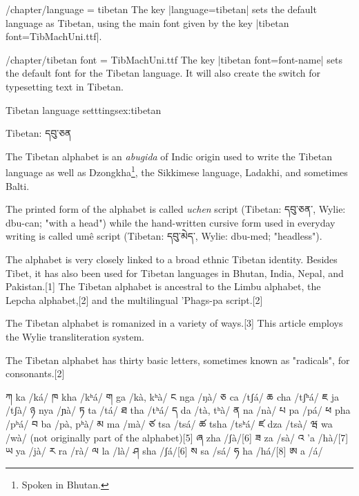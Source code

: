



\begin{key}{/chapter/language = tibetan} The key |language=tibetan| sets the default language as Tibetan, using the main font given by the key |tibetan font=TibMachUni.ttf|.
\end{key}

\begin{key}{/chapter/tibetan font = TibMachUni.ttf} The key |tibetan font=font-name| sets the default font for the Tibetan language. It will also create the switch \cmd{\tibetan} for typesetting text in Tibetan.
\end{key}

\begin{texexample}{Tibetan language setttings}{ex:tibetan}
\tibetan

\tibetan Tibetan: དབུ་ཅན
\end{texexample}


The Tibetan alphabet is an \emph{abugida} of Indic origin used to write the Tibetan language as well as Dzongkha\footnote{Spoken in Bhutan.}, the Sikkimese language, Ladakhi, and sometimes Balti. 

The printed form of the alphabet is called \textit{uchen} script (Tibetan: དབུ་ཅན་, Wylie: dbu-can; "with a head") while the hand-written cursive form used in everyday writing is called umê script (Tibetan: དབུ་མེད་, Wylie: dbu-med; "headless").

The alphabet is very closely linked to a broad ethnic Tibetan identity. Besides Tibet, it has also been used for Tibetan languages in Bhutan, India, Nepal, and Pakistan.[1] The Tibetan alphabet is ancestral to the Limbu alphabet, the Lepcha alphabet,[2] and the multilingual 'Phags-pa script.[2]


The Tibetan alphabet is romanized in a variety of ways.[3] This article employs the Wylie transliteration system.

The Tibetan alphabet has thirty basic letters, sometimes known as "radicals", for consonants.[2]

ཀ ka /ká/	ཁ kha /kʰá/	ག ga /kà, kʰà/	ང nga /ŋà/
ཅ ca /tʃá/	ཆ cha /tʃʰá/	ཇ ja /tʃà/	ཉ nya /ɲà/
ཏ ta /tá/	ཐ tha /tʰá/	ད da /tà, tʰà/	ན na /nà/
པ pa /pá/	ཕ pha /pʰá/	བ ba /pà, pʰà/	མ ma /mà/
ཙ tsa /tsá/	ཚ tsha /tsʰá/	ཛ dza /tsà/	ཝ wa /wà/ (not originally part of the alphabet)[5]
ཞ zha /ʃà/[6]	ཟ za /sà/	འ 'a /hà/[7]
ཡ ya /jà/	ར ra /rà/	ལ la /là/
ཤ sha /ʃá/[6]	ས sa /sá/	ཧ ha /há/[8]
ཨ a /á/

